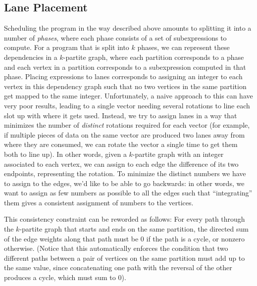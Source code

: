 \subsection{Lane Placement}  
Scheduling the program in the way described above amounts to splitting it into a number of {\em phases}, where each phase consists of a set of subexpressions to compute.
For a program that is split into $k$ phases, we can represent these dependencies in a $k$-partite graph, where each partition corresponds to a phase and each vertex in a partition corresponds to a subexpression computed in that phase.
Placing expressions to lanes corresponds to assigning an integer to each vertex in this dependency graph such that no two vertices in the same partition get mapped to the same integer.
Unfortunately, a naive approach to this can have very poor results, leading to a single vector needing several rotations to line each slot up with where it gets used.
Instead, we try to assign lanes in a way that minimizes the number of {\em distinct} rotations required for each vector (for example, if multiple pieces of data on the same vector are produced two lanes away from where they are consumed, we can rotate the vector a single time to get them both to line up).
In other words, given a $k$-partite graph with an integer associated to each vertex, we can assign to each edge the difference of its two endpoints, representing the rotation. 
To minimize the distinct numbers we have to assign to the edges, we'd like to be able to go backwards: in other words, we want to assign as few numbers as possible to all the edges such that ``integrating'' them gives a consistent assignment of numbers to the vertices.

This consistency constraint can be reworded as follows: For every path through the $k$-partite graph that starts and ends on the same partition, the directed sum of the edge weights along that path must be 0 if the path is a cycle, or nonzero otherwise.
(Notice that this automatically enforces the condition that two different paths between a pair of vertices on the same partition must add up to the same value, since concatenating one path with the reversal of the other produces a cycle, which must sum to 0).

